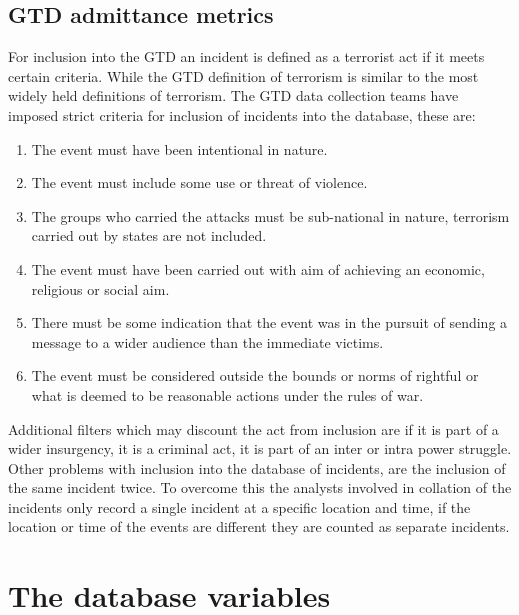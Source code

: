 \subsection{GTD admittance metrics}
For inclusion into the GTD an incident is defined as a terrorist act if it meets certain criteria. While the GTD definition of terrorism is similar to the most widely held definitions of terrorism. The GTD data collection teams have imposed strict criteria for inclusion of incidents into the database, these are:
\begin{enumerate}
\item The event must have been intentional in nature.
\item The event must include some use or threat of violence.
\item The groups who carried the attacks must be sub-national in nature, terrorism carried out by states are not included.
\item The event must have been carried out with aim of achieving an economic, religious or social aim.
\item There must be some indication that the event was in the pursuit of sending a message to a wider audience than the immediate victims.
\item  The event must be considered outside the bounds or norms of rightful or what is deemed to be reasonable actions under the rules of war.
\end{enumerate}

Additional filters which may discount the act from inclusion are if it is part of a wider insurgency, it is a criminal act, it is part of an inter or intra power struggle.
Other problems with inclusion into the database of incidents, are the inclusion of the same incident twice. To overcome this the analysts involved in collation of the incidents only record a single incident at a specific location and time, if the location or time of the events are different they are counted as separate incidents.

\section{The database variables}

